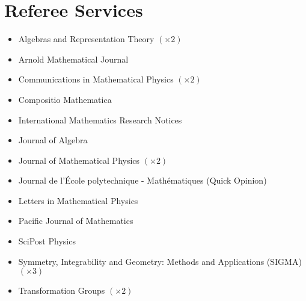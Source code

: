 \documentclass[11pt,letterpaper,roman,colorlinks,urlcolor=blue,linkcolor=blue
]{moderncv}
\begin{document}

\section{Referee Services}
\begin{itemize}[parsep=-0.2em, leftmargin=3.55cm]
    \item Algebras and Representation Theory $(\times 2)$
    \item Arnold Mathematical Journal
    \item Communications in Mathematical Physics $(\times 2)$
    \item Compositio Mathematica
    \item International Mathematics Research Notices
    \item Journal of Algebra
    \item Journal of Mathematical Physics $(\times 2)$
    \item Journal de l'École polytechnique - Mathématiques (Quick Opinion)
    \item Letters in Mathematical Physics
    \item Pacific Journal of Mathematics
    \item SciPost Physics
    \item Symmetry, Integrability and Geometry: Methods and Applications (SIGMA) $(\times 3)$
    \item Transformation Groups $(\times 2)$
\end{itemize}
\end{document}

